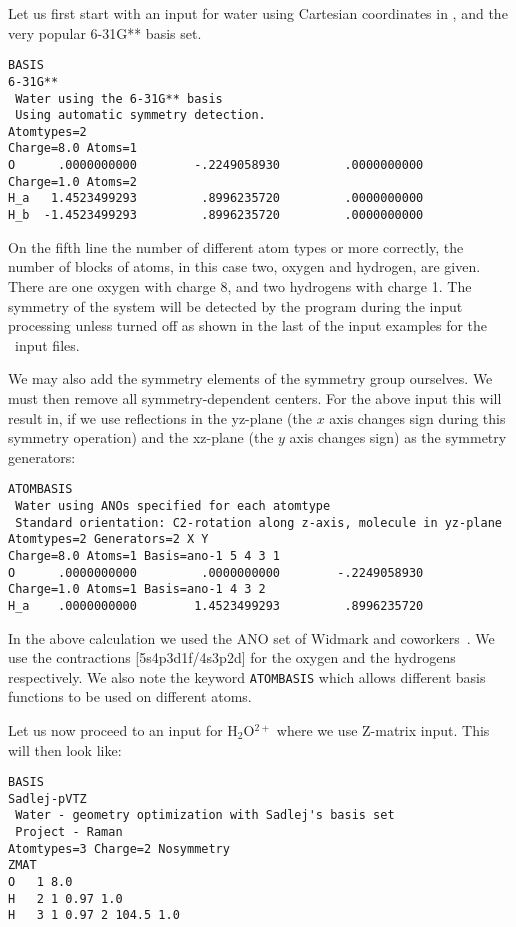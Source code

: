 Let us first start with an input for water using Cartesian coordinates
in \bohr{}, and the very popular 6-31G** basis set.

\begin{verbatim}
BASIS
6-31G**
 Water using the 6-31G** basis
 Using automatic symmetry detection.
Atomtypes=2
Charge=8.0 Atoms=1
O      .0000000000        -.2249058930         .0000000000
Charge=1.0 Atoms=2
H_a   1.4523499293         .8996235720         .0000000000
H_b  -1.4523499293         .8996235720         .0000000000
\end{verbatim}


On the fifth line the number of different atom types or more correctly,
the number of  blocks of atoms,
in this case two, oxygen and hydrogen, are given. There are one oxygen with
charge 8, and two hydrogens with charge 1. The symmetry of the system
will be detected by the program during the input processing unless
turned off as shown in the last of the input examples for the \molinp\
input files.

We may also add the symmetry elements of the
symmetry group\index{symmetry!group} ourselves. We must
then remove all symmetry-dependent centers. For the above input this
will result in, if we use reflections in the yz-plane (the $x$ axis changes sign during this
symmetry operation) and the xz-plane (the $y$ axis changes sign) as the symmetry generators: 

\begin{verbatim}
ATOMBASIS
 Water using ANOs specified for each atomtype
 Standard orientation: C2-rotation along z-axis, molecule in yz-plane
Atomtypes=2 Generators=2 X Y
Charge=8.0 Atoms=1 Basis=ano-1 5 4 3 1
O      .0000000000         .0000000000        -.2249058930
Charge=1.0 Atoms=1 Basis=ano-1 4 3 2
H_a    .0000000000        1.4523499293         .8996235720
\end{verbatim}

In the above calculation we used the ANO set of
Widmark and
coworkers~\cite{powpambortca77,powbjpbortca79}.
We use the contractions
[5s4p3d1f/4s3p2d] for the oxygen and the hydrogens respectively. We
also note the keyword \verb|ATOMBASIS|\index{ATOMBASIS} which allows
different basis functions to be used on different atoms.

Let us now proceed to an input for H$_{2}$O$^{2+}$ where we use
Z-matrix input. This will then look like:

\begin{verbatim}
BASIS
Sadlej-pVTZ
 Water - geometry optimization with Sadlej's basis set
 Project - Raman
Atomtypes=3 Charge=2 Nosymmetry
ZMAT
O   1 8.0
H   2 1 0.97 1.0
H   3 1 0.97 2 104.5 1.0
\end{verbatim}

